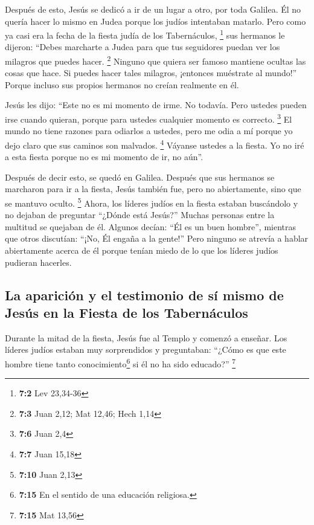  Después de esto, Jesús se dedicó a ir de un lugar a otro,
por toda Galilea. Él no quería hacer lo mismo en Judea porque los judíos
intentaban matarlo.  Pero como ya casi era la fecha de la
fiesta judía de los Tabernáculos, \footnote{\textbf{7:2} Lev 23,34-36}
 sus hermanos le dijeron: ``Debes marcharte a Judea para
que tus seguidores puedan ver los milagros que puedes hacer. \footnote{\textbf{7:3}
  Juan 2,12; Mat 12,46; Hech 1,14}  Ninguno que quiera ser
famoso mantiene ocultas las cosas que hace. Si puedes hacer tales
milagros, ¡entonces muéstrate al mundo!''  Porque incluso
sus propios hermanos no creían realmente en él.

 Jesús les dijo: ``Este no es mi momento de irme. No
todavía. Pero ustedes pueden irse cuando quieran, porque para ustedes
cualquier momento es correcto. \footnote{\textbf{7:6} Juan 2,4}
 El mundo no tiene razones para odiarlos a ustedes, pero
me odia a mí porque yo dejo claro que sus caminos son malvados.
\footnote{\textbf{7:7} Juan 15,18}  Váyanse ustedes a la
fiesta. Yo no iré a esta fiesta porque no es mi momento de ir, no aún''.

 Después de decir esto, se quedó en Galilea.
 Después que sus hermanos se marcharon para ir a la
fiesta, Jesús también fue, pero no abiertamente, sino que se mantuvo
oculto. \footnote{\textbf{7:10} Juan 2,13}  Ahora, los
líderes judíos en la fiesta estaban buscándolo y no dejaban de preguntar
``¿Dónde está Jesús?''  Muchas personas entre la multitud
se quejaban de él. Algunos decían: ``Él es un buen hombre'', mientras
que otros discutían: ``¡No, Él engaña a la gente!''  Pero
ninguno se atrevía a hablar abiertamente acerca de él porque tenían
miedo de lo que los líderes judíos pudieran hacerles.

\hypertarget{la-apariciuxf3n-y-el-testimonio-de-suxed-mismo-de-jesuxfas-en-la-fiesta-de-los-tabernuxe1culos}{%
\subsection{La aparición y el testimonio de sí mismo de Jesús en la
Fiesta de los
Tabernáculos}\label{la-apariciuxf3n-y-el-testimonio-de-suxed-mismo-de-jesuxfas-en-la-fiesta-de-los-tabernuxe1culos}}

 Durante la mitad de la fiesta, Jesús fue al Templo y
comenzó a enseñar.  Los líderes judíos estaban muy
sorprendidos y preguntaban: ``¿Cómo es que este hombre tiene tanto
conocimiento\footnote{\textbf{7:15} En el sentido de una educación
  religiosa.} si él no ha sido educado?'' \footnote{\textbf{7:15} Mat
  13,56}

